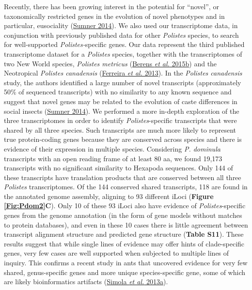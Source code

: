 Recently, there has been growing interest in the potential for
``novel'', or taxonomically restricted genes in the evolution of novel
phenotypes and in particular, eusociality
(\protect\hyperlink{ux5fENREFux5f58}{Sumner 2014}). We also used our
transcriptome data, in conjunction with previously published data for
other \textit{Polistes} species, to search for well-supported
\textit{Polistes-}specific genes. Our data represent the third published
transcriptome dataset for a \textit{Polistes} species, together with the
transcriptomes of two New World species, \textit{Polistes metricus}
(\protect\hyperlink{ux5fENREFux5f3}{Berens \textit{et al.} 2015b}) and the
Neotropical \textit{Polistes canadensis}
(\protect\hyperlink{ux5fENREFux5f10}{Ferreira \textit{et al.} 2013}). In
the \textit{Polistes canadensis} study, the authors identified a large
number of novel transcripts (approximately 50\% of sequenced
transcripts) with no similarity to any known sequence and suggest that
novel genes may be related to the evolution of caste differences in
social insects (\protect\hyperlink{ux5fENREFux5f58}{Sumner 2014}). We
performed a more in-depth exploration of the three transcriptomes in
order to identify \textit{Polistes}-specific transcripts that were shared
by all three species. Such transcripts are much more likely to represent
true protein-coding genes because they are conserved across species and
there is evidence of their expression in multiple species. Considering
\textit{P. dominula} transcripts with an open reading frame of at least 80
aa, we found 19,173 transcripts with no significant similarity to
Hexapoda sequences. Only 144 of these transcripts have translation
products that are conserved between all three \textit{Polistes}
transcriptomes. Of the 144 conserved shared transcripts, 118 are found
in the annotated genome assembly, aligning to 93 different iLoci
(\textbf{Figure \ref{Fig:Pdom2}C}). Only 10 of these 93 iLoci also have evidence of
\textit{Polistes}-specific genes from the genome annotation (in the form
of gene models without matches to protein databases), and even in these
10 cases there is little agreement between transcript alignment
structure and predicted gene structure (\textbf{Table S11}). These
results suggest that while single lines of evidence may offer hints of
clade-specific genes, very few cases are well supported when subjected
to multiple lines of inquiry. This confirms a recent study in ants that
uncovered evidence for very few shared, genus-specific genes and more
unique species-specific gene, some of which are likely bioinformatics
artifacts (\protect\hyperlink{ux5fENREFux5f52}{Simola \textit{et al.}
2013a}).

